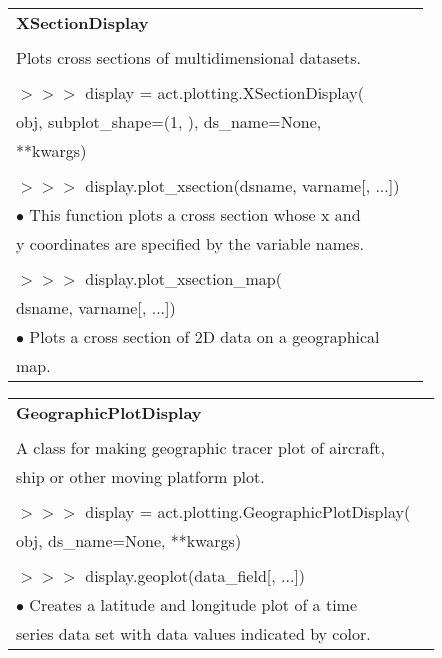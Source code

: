 \documentclass[potrait, z1paper, fontscale=0.33]{baposter} %
\begin{document}
\begin{poster}
{\begin{flushleft}
\begin{tabular}{@{}ll@{}}
\\
\multicolumn{2}{l}{\cellcolor[HTML]{DDFFFF}\bf XSectionDisplay} \\
\\
Plots cross sections of multidimensional datasets.\\
\\
$>$$>$$>$ display = act.plotting.XSectionDisplay(\\
\-\hspace{1.2cm} obj, subplot\_shape=(1, ), ds\_name=None,\\
\-\hspace{1.2cm} **kwargs)\\
\\
$>$$>$$>$ display.plot\_xsection(dsname, varname[, ...])\\
\-\hspace{0.2cm} $\bullet$ This function plots a cross section whose x and\\
\-\hspace{0.5cm} y coordinates are specified by the variable names.\\
\\
$>$$>$$>$ display.plot\_xsection\_map(\\
\-\hspace{1.2cm} dsname, varname[, ...])\\
\-\hspace{0.2cm} $\bullet$ Plots a cross section of 2D data on a geographical\\
\-\hspace{0.5cm} map.\\
\end{tabular}

\begin{tabular}{@{}ll@{}}
\\
\multicolumn{2}{l}{\cellcolor[HTML]{DDFFFF}\bf GeographicPlotDisplay} \\
\\
A class for making geographic tracer plot of aircraft,\\
ship or other moving platform plot.\\
\\
$>$$>$$>$ display = act.plotting.GeographicPlotDisplay(\\
\-\hspace{1.2cm} obj, ds\_name=None, **kwargs)\\
\\
$>$$>$$>$ display.geoplot(data\_field[, ...])\\
\-\hspace{0.2cm} $\bullet$ Creates a latitude and longitude plot of a time\\
\-\hspace{0.5cm} series data set with data values indicated by color.\\
\end{tabular}


\end{flushleft}}
\end{poster}
\end{document}
